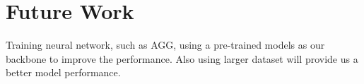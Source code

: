 \section{Future Work}


Training neural network, such as AGG, using a pre-trained models as our backbone to improve the performance. Also using larger dataset will provide us a better model performance.
